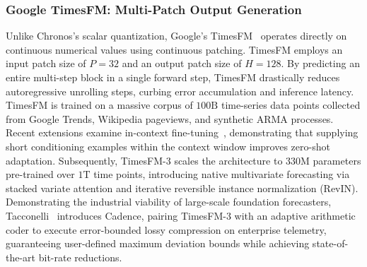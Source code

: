 \subsubsection{Google TimesFM: Multi-Patch Output Generation}
Unlike Chronos's scalar quantization, Google's TimesFM~\cite{das2024timesfm} operates directly on continuous numerical values using continuous patching. TimesFM employs an input patch size of $P = 32$ and an output patch size of $H = 128$. By predicting an entire multi-step block in a single forward step, TimesFM drastically reduces autoregressive unrolling steps, curbing error accumulation and inference latency.
TimesFM is trained on a massive corpus of $100\text{B}$ time-series data points collected from Google Trends, Wikipedia pageviews, and synthetic ARMA processes. Recent extensions examine in-context fine-tuning~\cite{das2024incontext}, demonstrating that supplying short conditioning examples within the context window improves zero-shot adaptation.
Subsequently, TimesFM-3 scales the architecture to $330\text{M}$ parameters pre-trained over $1\text{T}$ time points, introducing native multivariate forecasting via stacked variate attention and iterative reversible instance normalization (RevIN). Demonstrating the industrial viability of large-scale foundation forecasters, Tacconelli~\cite{tacconelli2026cadence} introduces Cadence, pairing TimesFM-3 with an adaptive arithmetic coder to execute error-bounded lossy compression on enterprise telemetry, guaranteeing user-defined maximum deviation bounds while achieving state-of-the-art bit-rate reductions.

